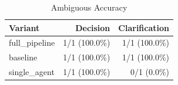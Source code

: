\begin{table}[htbp]
\centering
\caption{Ambiguous Accuracy}
\label{tab:acc-ambig}
\begin{tabular}{l rr}
\toprule
Variant & Decision & Clarification \\
\midrule
  full\_pipeline & 1/1 (100.0\%) & 1/1 (100.0\%) \\
  baseline & 1/1 (100.0\%) & 1/1 (100.0\%) \\
  single\_agent & 1/1 (100.0\%) & 0/1 (0.0\%) \\
\bottomrule
\end{tabular}
\end{table}
